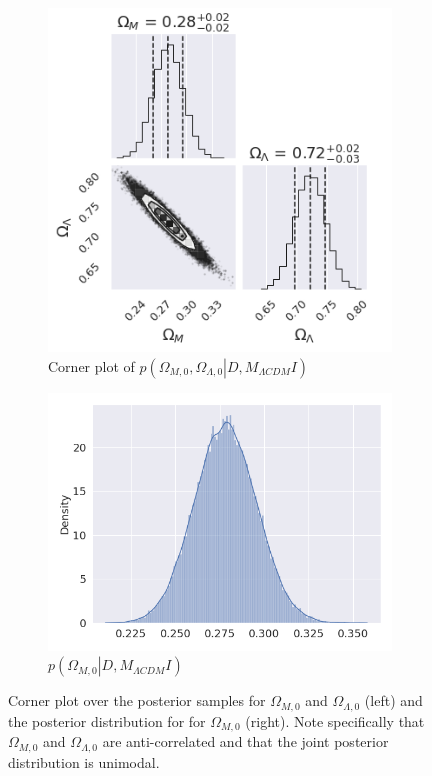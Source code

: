 \documentclass[11pt,a4paper]{article}
\begin{document}
\begin{figure}[H]
    \centering
    \begin{subfigure}{.5\textwidth}
          \centering
          \includegraphics[width=0.9\linewidth]{figures/corner_task2.png}
          \caption{Corner plot of $p\left(\Omega_{M,0},\Omega_{\Lambda,0} \left. \right\vert D, M_{\Lambda CDM} I \right)$}
          \label{fig:sub1}
    \end{subfigure}%
    \begin{subfigure}{.5\textwidth}
          \centering
          \includegraphics[width=0.9\linewidth]{figures/posterior_task2.png}
          \caption{$p\left(\Omega_{M,0} \left. \right\vert D, M_{\Lambda CDM} I\right)$}
          \label{fig:sub2}
    \end{subfigure}
    \caption{Corner plot over the posterior samples for $\Omega_{M,0}$ and $\Omega_{\Lambda,0}$ (left) and the posterior distribution for for $\Omega_{M,0}$ (right). Note specifically that $\Omega_{M,0}$ and $\Omega_{\Lambda,0}$ are anti-correlated and that the joint posterior distribution is unimodal.}
    \label{fig:posterior_task2}
\end{figure}

\printbibliography
\end{document}
